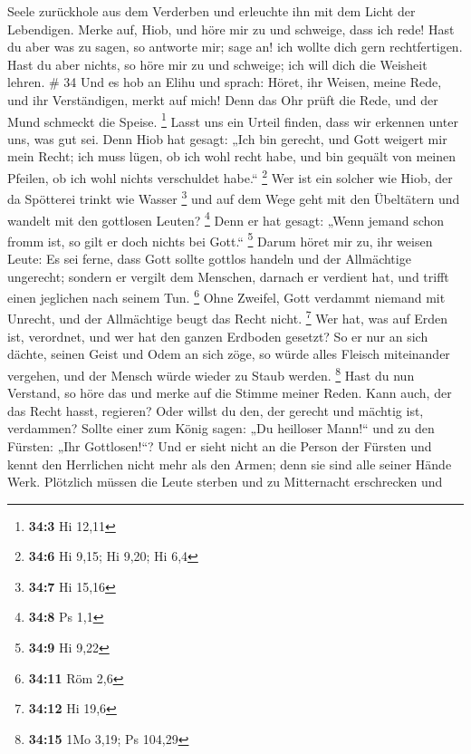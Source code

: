 Seele zurückhole aus dem Verderben und erleuchte ihn mit dem Licht der
Lebendigen.  Merke auf, Hiob, und höre mir zu und schweige,
dass ich rede!  Hast du aber was zu sagen, so antworte mir;
sage an! ich wollte dich gern rechtfertigen.  Hast du aber
nichts, so höre mir zu und schweige; ich will dich die Weisheit lehren.
\# 34  Und es hob an Elihu und sprach:  Höret,
ihr Weisen, meine Rede, und ihr Verständigen, merkt auf mich!
 Denn das Ohr prüft die Rede, und der Mund schmeckt die
Speise. \footnote{\textbf{34:3} Hi 12,11}  Lasst uns ein
Urteil finden, dass wir erkennen unter uns, was gut sei. 
Denn Hiob hat gesagt: „Ich bin gerecht, und Gott weigert mir mein Recht;
 ich muss lügen, ob ich wohl recht habe, und bin gequält von
meinen Pfeilen, ob ich wohl nichts verschuldet habe.`` \footnote{\textbf{34:6}
  Hi 9,15; Hi 9,20; Hi 6,4}  Wer ist ein solcher wie Hiob,
der da Spötterei trinkt wie Wasser \footnote{\textbf{34:7} Hi 15,16}
 und auf dem Wege geht mit den Übeltätern und wandelt mit
den gottlosen Leuten? \footnote{\textbf{34:8} Ps 1,1}  Denn
er hat gesagt: „Wenn jemand schon fromm ist, so gilt er doch nichts bei
Gott.`` \footnote{\textbf{34:9} Hi 9,22}  Darum höret mir
zu, ihr weisen Leute: Es sei ferne, dass Gott sollte gottlos handeln und
der Allmächtige ungerecht;  sondern er vergilt dem
Menschen, darnach er verdient hat, und trifft einen jeglichen nach
seinem Tun. \footnote{\textbf{34:11} Röm 2,6}  Ohne
Zweifel, Gott verdammt niemand mit Unrecht, und der Allmächtige beugt
das Recht nicht. \footnote{\textbf{34:12} Hi 19,6}  Wer
hat, was auf Erden ist, verordnet, und wer hat den ganzen Erdboden
gesetzt?  So er nur an sich dächte, seinen Geist und Odem
an sich zöge,  so würde alles Fleisch miteinander vergehen,
und der Mensch würde wieder zu Staub werden. \footnote{\textbf{34:15}
  1Mo 3,19; Ps 104,29}  Hast du nun Verstand, so höre das
und merke auf die Stimme meiner Reden.  Kann auch, der das
Recht hasst, regieren? Oder willst du den, der gerecht und mächtig ist,
verdammen?  Sollte einer zum König sagen: „Du heilloser
Mann!{}`` und zu den Fürsten: „Ihr Gottlosen!{}``?  Und er
sieht nicht an die Person der Fürsten und kennt den Herrlichen nicht
mehr als den Armen; denn sie sind alle seiner Hände Werk. 
Plötzlich müssen die Leute sterben und zu Mitternacht erschrecken und
